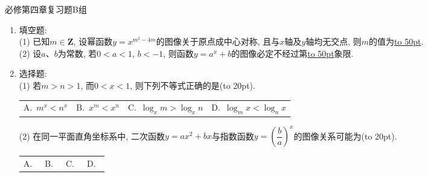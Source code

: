 \documentclass[10pt,a4paper]{article}
\newcommand{\blank}[1]{\underline{\hbox to #1pt{}}}
\newcommand{\bracket}[1]{(\hbox to #1pt{})}
\newcommand{\fourch}[4]{\par\begin{tabular}{p{.23\textwidth}p{.23\textwidth}p{.23\textwidth}p{.23\textwidth}}
A.~#1 &B.~#2& C.~#3& D.~#4
\end{tabular}}
\begin{document}
必修第四章复习题B组
\begin{enumerate}[1.]

\item 填空题:\\
(1) 已知$m\in \mathbf{Z}$, 设幂函数$y=x^{m^2-4m}$的图像关于原点成中心对称, 且与$x$轴及$y$轴均无交点, 则$m$的值为\blank{50}.\\
(2) 设$a$、$b$为常数, 若$0<a<1$, $b<-1$, 则函数$y=a^x+b$的图像必定不经过第\blank{50}象限.
\vspace*{3cm}
\item 选择题:\\
(1) 若$m>n>1$, 而$0<x<1$, 则下列不等式正确的是\bracket{20}.
\fourch{$m^x<n^x$}{$x^m<x^n$}{$\log_x m>\log_x n$}{$\log_m x<\log_n x$}
(2) 在同一平面直角坐标系中, 二次函数$y=ax^2+bx$与指数函数$y=(\dfrac ba)^x$的图像关系可能为\bracket{20}.
\fourch{
\begin{tikzpicture}[scale = 0.5, >=latex]
    \draw [->] (-2.5,0) -- (2.5,0) node [below] {$x$};
    \draw [->] (0,-2.) -- (0,2.5) node [left] {$y$};
    \draw (0,0) node [below right] {$O$};
    \draw (-1,0.1) -- (-1,0) node [below] {$-1$};
    \draw (0.1,1) -- (0,1) node [left] {$1$};
    \draw [domain = -1.2:0.7,thick] plot (\x,{3*\x * (\x+0.5)});
    \draw [domain = -1.4:2,thick] plot (\x,{(0.5)^\x}); 
\end{tikzpicture}
}{
\begin{tikzpicture}[scale = 0.5, >=latex]
    \draw [->] (-2.5,0) -- (2.5,0) node [below] {$x$};
    \draw [->] (0,-2.) -- (0,2.5) node [left] {$y$};
    \draw (0,0) node [below left] {$O$};
    \draw (1,0.1) -- (1,0) node [below] {$1$};
    \draw (0.1,1) -- (0,1) node [above right] {$1$};
    \draw [domain = -0.5:1.5,thick] plot (\x,{3*\x*(\x-1)});
    \draw [domain = -1.4:2,thick] plot (\x,{(0.5)^\x}); 
\end{tikzpicture}
}{
\begin{tikzpicture}[scale = 0.5, >=latex]
    \draw [->] (-2.5,0) -- (2.5,0) node [below] {$x$};
    \draw [->] (0,-2.) -- (0,2.5) node [left] {$y$};
    \draw (0,0) node [below left] {$O$};
    \draw (1,0.1) -- (1,0) node [below] {$1$};
    \draw (0.1,1) -- (0,1) node [left] {$1$};
    \draw [domain = -0.5:2.5,thick] plot ({\x},{-\x*(\x-2)});
    \draw [domain = -1.4:2,thick] plot ({-\x},{(0.5)^\x}); 
\end{tikzpicture}
}{
\begin{tikzpicture}[scale = 0.5, >=latex]
    \draw [->] (-2.5,0) -- (2.5,0) node [below] {$x$};
    \draw [->] (0,-2.) -- (0,2.5) node [left] {$y$};
    \draw (0,0) node [below right] {$O$};

\end{tikzpicture}}
\end{enumerate}
\end{document}
